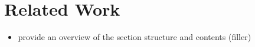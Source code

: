 \section{Related Work}

\begin{itemize}
  \item provide an overview of the section structure and contents (filler)
\end{itemize}






